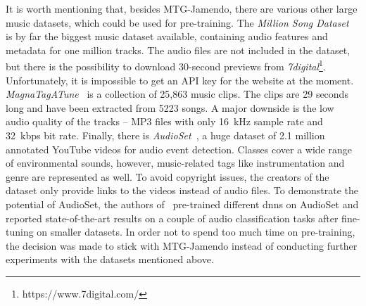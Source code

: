 It is worth mentioning that, besides MTG-Jamendo, there are various other large music datasets, which could be used for pre-training. The \textit{Million Song Dataset}~\cite{bertin2011msd} is by far the biggest music dataset available, containing audio features and metadata for one million tracks. The audio files are not included in the dataset, but there is the possibility to download 30-second previews from \textit{7digital}\footnote{https://www.7digital.com/}. Unfortunately, it is impossible to get an API key for the website at the moment. \textit{MagnaTagATune}~\cite{law2009mtat} is a collection of 25,863 music clips. The clips are 29 seconds long and have been extracted from 5223 songs. A major downside is the low audio quality of the tracks -- MP3 files with only \SI{16}{\kilo\hertz} sample rate and \SI{32}{kbps} bit rate. Finally, there is \textit{AudioSet}~\cite{gemmeke2017audioset}, a huge dataset of 2.1 million annotated YouTube videos for audio event detection. Classes cover a wide range of environmental sounds, however, music-related tags like instrumentation and genre are represented as well. To avoid copyright issues, the creators of the dataset only provide links to the videos instead of audio files. To demonstrate the potential of AudioSet, the authors of~\cite{kong2020panns} pre-trained different \glspl{dnn} on AudioSet and reported state-of-the-art results on a couple of audio classification tasks after fine-tuning on smaller datasets. In order not to spend too much time on pre-training, the decision was made to stick with MTG-Jamendo instead of conducting further experiments with the datasets mentioned above.


